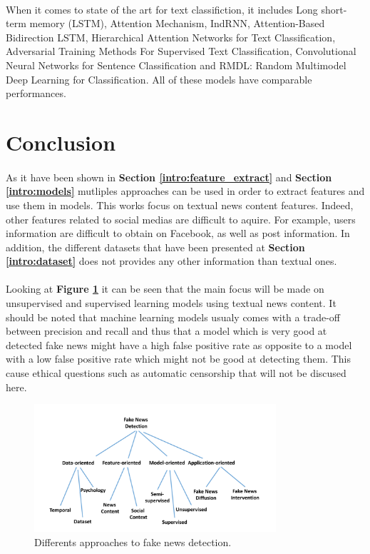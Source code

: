 \paragraph{}
When it comes to state of the art for text classifiction, it includes Long short-term memory (LSTM)\cite{Hochreiter1997LongSM}, Attention Mechanism\cite{Vaswani2017AttentionIA}, IndRNN\cite{Li2018}, Attention-Based Bidirection LSTM\cite{zhou-etal-2016-attention}, Hierarchical Attention Networks for Text Classification\cite{yang_hierarchical_2016}, Adversarial Training Methods For Supervised Text Classification\cite{miyato_adversarial_2016}, Convolutional Neural Networks for Sentence Classification\cite{kim_convolutional_2014} and RMDL: Random Multimodel Deep Learning for Classification\cite{kowsari_rmdl:_2018}. All of these models have comparable performances. 
\section{Conclusion}
\paragraph{} As it have been shown in \textbf{Section \ref{intro:feature_extract}} and \textbf{Section \ref{intro:models}} mutliples approaches can be used in order to extract features and use them in models. This works focus on textual news content features. Indeed, other features related to social medias are difficult to aquire. For example, users information are difficult to obtain on Facebook, as well as post information. In addition, the different datasets that have been presented at \textbf{Section \ref{intro:dataset}} does not provides any other information than textual ones. 

\paragraph{} Looking at \textbf{Figure \ref{fig:intro:features}} it can be seen that the main focus will be made on unsupervised and supervised learning models using textual news content. It should be noted that machine learning models usualy comes with a trade-off between precision and recall and thus that a model which is very good at detected fake news might have a high false positive rate as opposite to a model with a low false positive rate which might not be good at detecting them. This cause ethical questions such as automatic censorship that will not be discused here. 

\begin{figure}
	\centering
	\includegraphics[width=0.8\textwidth]{images/introduction/features}
	\caption{Differents approaches to fake news detection.}
	\label{fig:intro:features}
\end{figure}